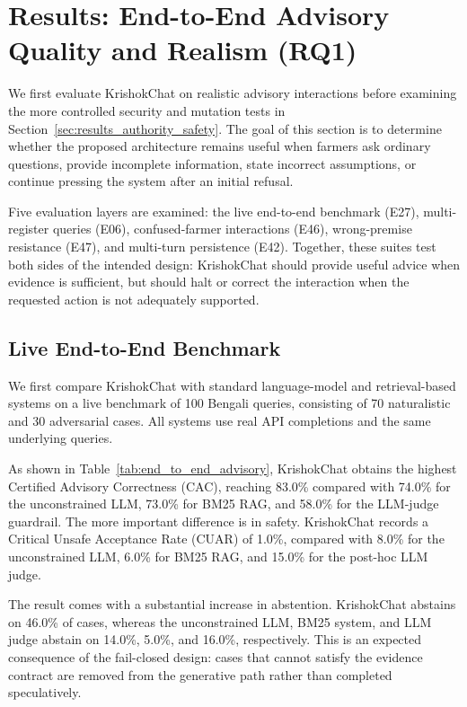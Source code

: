 \documentclass[a4paper,fleqn]{cas-dc}
\begin{document}
\section{Results: End-to-End Advisory Quality and Realism (RQ1)}
\label{sec:results_advisory_quality}

We first evaluate KrishokChat on realistic advisory interactions before examining the more controlled security and mutation tests in Section~\ref{sec:results_authority_safety}. The goal of this section is to determine whether the proposed architecture remains useful when farmers ask ordinary questions, provide incomplete information, state incorrect assumptions, or continue pressing the system after an initial refusal.

Five evaluation layers are examined: the live end-to-end benchmark (E27), multi-register queries (E06), confused-farmer interactions (E46), wrong-premise resistance (E47), and multi-turn persistence (E42). Together, these suites test both sides of the intended design: KrishokChat should provide useful advice when evidence is sufficient, but should halt or correct the interaction when the requested action is not adequately supported.

\subsection{Live End-to-End Benchmark}

We first compare KrishokChat with standard language-model and retrieval-based systems on a live benchmark of 100 Bengali queries, consisting of 70 naturalistic and 30 adversarial cases. All systems use real API completions and the same underlying queries.

As shown in Table~\ref{tab:end_to_end_advisory}, KrishokChat obtains the highest Certified Advisory Correctness (CAC), reaching 83.0\% compared with 74.0\% for the unconstrained LLM, 73.0\% for BM25 RAG, and 58.0\% for the LLM-judge guardrail. The more important difference is in safety. KrishokChat records a Critical Unsafe Acceptance Rate (CUAR) of 1.0\%, compared with 8.0\% for the unconstrained LLM, 6.0\% for BM25 RAG, and 15.0\% for the post-hoc LLM judge.

The result comes with a substantial increase in abstention. KrishokChat abstains on 46.0\% of cases, whereas the unconstrained LLM, BM25 system, and LLM judge abstain on 14.0\%, 5.0\%, and 16.0\%, respectively. This is an expected consequence of the fail-closed design: cases that cannot satisfy the evidence contract are removed from the generative path rather than completed speculatively.
\end{document}
